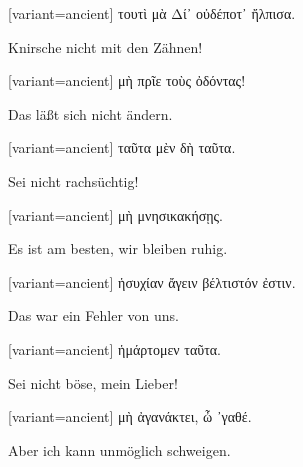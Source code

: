 \begin{greek}[variant=ancient]%
τουτὶ μὰ Δί᾽ οὐδέποτ᾽ ἤλπισα.

\end{greek}%
\switchcolumn*

Knirsche nicht mit den Zähnen! 

\switchcolumn

\begin{greek}[variant=ancient]%
μὴ πρῖε τοὺς ὀδόντας!

\end{greek}%
\switchcolumn*

Das läßt sich nicht ändern. 

\switchcolumn

\begin{greek}[variant=ancient]%
ταῦτα μὲν δὴ ταῦτα.

\end{greek}%
\switchcolumn*

Sei nicht rachsüchtig! 

\switchcolumn

\begin{greek}[variant=ancient]%
μὴ μνησικακήσῃς.

\end{greek}%
\switchcolumn*

Es ist am besten, wir bleiben ruhig. 

\switchcolumn

\begin{greek}[variant=ancient]%
ἡσυχίαν ἄγειν βέλτιστόν ἐστιν.

\end{greek}%
\switchcolumn*

Das war ein Fehler von uns. 

\switchcolumn

\begin{greek}[variant=ancient]%
ἡμάρτομεν ταῦτα.

\end{greek}%
\switchcolumn*

Sei nicht böse, mein Lieber! 

\switchcolumn

\begin{greek}[variant=ancient]%
μὴ ἀγανάκτει, ὦ ᾽γαθέ.

\end{greek}%
\switchcolumn*

Aber ich kann unmöglich schweigen. 

\switchcolumn

